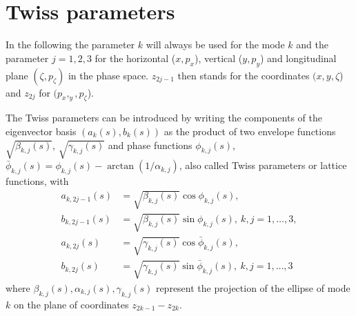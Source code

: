 \section{Twiss parameters}
\label{opt:sec:4}
In the following the parameter $k$ will always be used for the mode $k$ and the parameter
$j=1,2,3$ for the horizontal ($x,p_x$), vertical ($y,p_y$) and longitudinal plane
$(\zeta,p_\zeta)$ in the phase space. $z_{2j-1}$ then stands for the coordinates $(x,y,\zeta$)
and $z_{2j}$ for $(p_x,_y,p_\zeta$).

The Twiss parameters can be introduced by writing the components of the eigenvector basis
$(a_k(s),b_k(s))$ as the product of two envelope functions $\sqrt{\beta_{k,j}(s)}$,
$\sqrt{\gamma_{k,j}(s)}$ and phase functions $\phi_{k,j}(s)$, $\bar\phi_{k,j}(s) = \phi_{k,j}(s) - \arctan(1/\alpha_{k,j})$,
also called Twiss parameters or lattice functions, with
\begin{align}
a_{k,2j-1}(s)&=\sqrt{\beta_{k,j}(s)}\cos{\phi_{k,j}(s)},\nonumber\\ b_{k,2j-1}(s)&=\sqrt{\beta_{k,j}(s)}\sin{\phi_{k,j}(s)}, \ k,j=1,\ldots,3, \label{opt:eqn:4:1}\\
a_{k,2j}(s)&=\sqrt{\gamma_{k,j}(s)}\cos{\bar\phi_{k,j}(s)}, \nonumber\\
b_{k,2j}(s)&=\sqrt{\gamma_{k,j}(s)}\sin{\bar\phi_{k,j}(s)}, \ k,j=1,\ldots,3 \label{opt:eqn:4:2}
\end{align}
where $\beta_{k,j}(s), \alpha_{k,j}(s), \gamma_{k,j}(s)$ represent the projection of the ellipse of mode $k$ on the plane of coordinates $z_{2k-1}-z_{2k}$.

